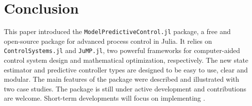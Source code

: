 \section{Conclusion}

This paper introduced the \texttt{ModelPredictiveControl.jl} package, a free and open-source package for advanced process control in Julia. It relies on \texttt{ControlSystems.jl} and \texttt{JuMP.jl}, two powerful frameworks for computer-aided control system design and mathematical optimization, respectively. The new state estimator and predictive controller types are designed to be easy to use, clear and modular. The main features of the package were described and illustrated with two case studies. The package is still under active development and contributions are welcome. Short-term developments will focus on implementing . 